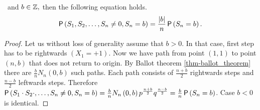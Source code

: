 \begin{thm}\label{thm-probability_position_b_at_time_n_without_return_origin}
 \Lrws\ and $b \in \mathbb{Z},$ then the following equation holds.
 \[\operatorname{\mathsf{P}} \left( S_1, S_2, \ldots, S_n\neq 0, S_n=b \right)
 =\frac{\left|{b}\right|}{n}\operatorname{\mathsf{P}} \left( S_n=b \right).
 \]
\end{thm}
\begin{proof}
 Let us without loss of generality assume that $b>0$. In that case, first step has to be rightwards $\left(X_1=+1\right).$ Now we have path from point $ \left( 1,1 \right) $ to point $ \left( n,b \right) $ that does not return to origin.
 By Ballot theorem \ref{thm-ballot_theorem} there are $\frac{b}{n}N_n \left( 0,b \right) $ such paths. Each path consists of $\frac{n+b}{2}$ rightwards steps and $\frac{n-b}{2}$ leftwards steps.
 Therefore $\operatorname{\mathsf{P}} \left( S_1\cdot S_2 \cdot, \ldots, S_n\neq 0, S_n=b \right)
 =\frac{b}{n}N_n \left( 0,b \right) p^{\frac{n+b}{2}}q^{\frac{n-b}{2}}
 =\frac{b}{n}\operatorname{\mathsf{P}} \left( S_n=b \right) $. Case $b<0$ is identical.
\end{proof}


